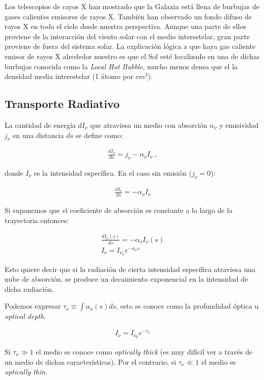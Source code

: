 \documentclass{tufte-handout}
\begin{document}
Los telescopios de rayos X han mostrado que la Galaxia está llena de burbujas de gases calientes emisores de rayos X. También han observado un fondo difuso de rayos X en todo el cielo desde nuestra perspectiva. Aunque una parte de ellos proviene de la interacción del viento solar con el medio interestelar, gran parte proviene de fuera del sistema solar. La explicación lógica a que haya gas caliente emisor de rayos X alrededor nuestro es que el Sol esté localizado en una de dichas burbujas conocida como la \emph{Local Hot Bubble}, mucho menos densa que el la densidad media interestelar (1 átomo por $cm^3$).

\subsection{Transporte Radiativo}

La cantidad de energía $dI_\nu$ que atraviesa un medio con absorción $\alpha_\nu$ y emisividad $j_\nu$ en una distancia $ds$ se define como:

\begin{align}
\frac{dI_\nu}{ds} = j_\nu - \alpha_\nu I_\nu~,
\end{align}

donde $I_\nu$ es la intensidad específica. En el caso sin emisión ($j_\nu = 0$):

\begin{align}
  \frac{dI_\nu}{ds} = - \alpha_\nu I_\nu
\end{align}

Si suponemos que el coeficiente de absorción es constante a lo largo de la trayectoria entonces:

\begin{align}
  \frac{dI_\nu(s)}{ds} = - \alpha_\nu I_\nu(s)\\
  I_\nu = I_{\nu_0} e^{- \alpha_\nu s}
\end{align}

Esto quiere decir que si la radiación de cierta intensidad específica atraviesa una nube de absorción, se produce un decaimiento exponencial en la intensidad de dicha radiación.

Podemos expresar $\tau_\nu \equiv \int \alpha_\nu(s) ds$, esto se conoce como la profundidad óptica u \emph{optical depth}.

\begin{align}
  I_\nu = I_{\nu_0} e^{-\tau_\nu}
\end{align}

Si $\tau_\nu \gg 1$ el medio se conoce como \emph{optically thick} (es muy difícil ver a través de un medio de dichas características). Por el contrario, si $\tau_\nu \ll 1$ el medio es \emph{optically thin}.
\end{document}
